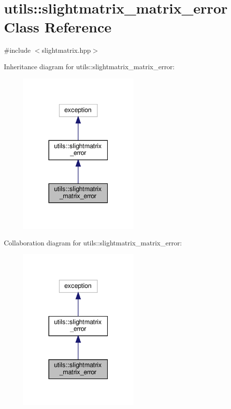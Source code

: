 \hypertarget{classutils_1_1slightmatrix__matrix__error}{}\section{utils\+:\+:slightmatrix\+\_\+matrix\+\_\+error Class Reference}
\label{classutils_1_1slightmatrix__matrix__error}


{\ttfamily \#include $<$slightmatrix.\+hpp$>$}



Inheritance diagram for utils\+:\+:slightmatrix\+\_\+matrix\+\_\+error\+:\nopagebreak
\begin{figure}[H]
\begin{center}
\leavevmode
\includegraphics[width=171pt]{classutils_1_1slightmatrix__matrix__error__inherit__graph}
\end{center}
\end{figure}


Collaboration diagram for utils\+:\+:slightmatrix\+\_\+matrix\+\_\+error\+:\nopagebreak
\begin{figure}[H]
\begin{center}
\leavevmode
\includegraphics[width=171pt]{classutils_1_1slightmatrix__matrix__error__coll__graph}
\end{center}
\end{figure}


